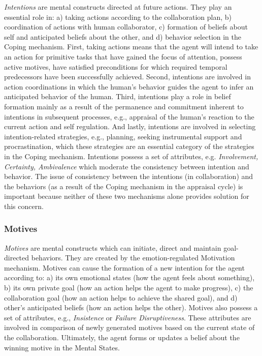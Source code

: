 \textit{Intentions} are mental constructs directed at future actions. They play
an essential role in: a) taking actions according to the collaboration plan, b)
coordination of actions with human collaborator, c) formation of beliefs about
self and anticipated beliefs about the other, and d) behavior selection in the
Coping mechanism. First, taking actions means that the agent will intend to take
an action for primitive tasks that have gained the focus of attention, possess
active motives, have satisfied preconditions for which required temporal
predecessors have been successfully achieved. Second, intentions are involved
in action coordinations in which the human's behavior guides the agent to infer
an anticipated behavior of the human. Third, intentions play a role in belief
formation mainly as a result of the permanence and commitment inherent to
intentions in subsequent processes, e.g., appraisal of the human's reaction to
the current action and self regulation. And lastly, intentions are involved in
selecting intention-related strategies, e.g., planning, seeking instrumental
support and procrastination, which these strategies are an essential category of
the strategies in the Coping mechanism. Intentions possess a set of attributes,
e.g. \textit{Involvement, Certainty, Ambivalence} which moderate the consistency
between intention and behavior. The issue of consistency between the intentions
(in collaboration) and the behaviors (as a result of the Coping mechanism in the
appraisal cycle) is important because neither of these two mechanisms alone
provides solution for this concern.

\subsubsection{Motives}

\textit{Motives} are mental constructs which can initiate, direct and maintain
goal-directed behaviors. They are created by the emotion-regulated Motivation
mechanism. Motives can cause the formation of a new intention for the agent
according to: a) its own emotional states (how the agent feels about something),
b) its own private goal (how an action helps the agent to make progress), c) the
collaboration goal (how an action helps to achieve the shared goal), and d)
other's anticipated beliefs (how an action helps the other). Motives also
possess a set of attributes, e.g., \textit{Insistence} or \textit{Failure
Disruptiveness}. These attributes are involved in comparison of newly generated
motives based on the current state of the collaboration. Ultimately, the agent
forms or updates a belief about the winning motive in the Mental States.

